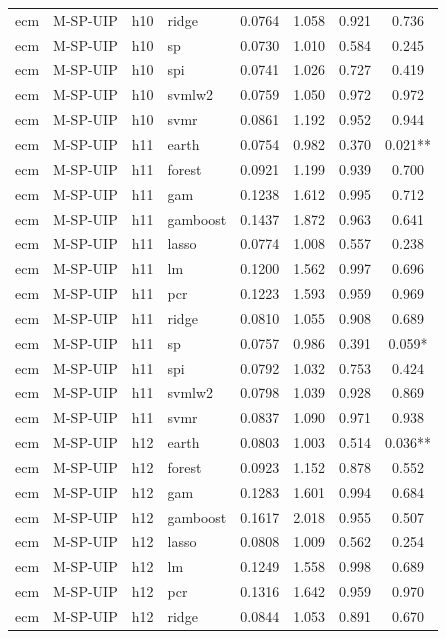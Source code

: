 \begin{ThreePartTable}
\begin{longtable}[t]{llclcccc}
ecm & M-SP-UIP & h10 & ridge & 0.0764 & 1.058 & 0.921 & 0.736\\
ecm & M-SP-UIP & h10 & sp & 0.0730 & 1.010 & 0.584 & 0.245\\
ecm & M-SP-UIP & h10 & spi & 0.0741 & 1.026 & 0.727 & 0.419\\
ecm & M-SP-UIP & h10 & svmlw2 & 0.0759 & 1.050 & 0.972 & 0.972\\
ecm & M-SP-UIP & h10 & svmr & 0.0861 & 1.192 & 0.952 & 0.944\\
\addlinespace
ecm & M-SP-UIP & h11 & earth & 0.0754 & 0.982 & 0.370 & 0.021**\\
ecm & M-SP-UIP & h11 & forest & 0.0921 & 1.199 & 0.939 & 0.700\\
ecm & M-SP-UIP & h11 & gam & 0.1238 & 1.612 & 0.995 & 0.712\\
ecm & M-SP-UIP & h11 & gamboost & 0.1437 & 1.872 & 0.963 & 0.641\\
ecm & M-SP-UIP & h11 & lasso & 0.0774 & 1.008 & 0.557 & 0.238\\
ecm & M-SP-UIP & h11 & lm & 0.1200 & 1.562 & 0.997 & 0.696\\
ecm & M-SP-UIP & h11 & pcr & 0.1223 & 1.593 & 0.959 & 0.969\\
ecm & M-SP-UIP & h11 & ridge & 0.0810 & 1.055 & 0.908 & 0.689\\
ecm & M-SP-UIP & h11 & sp & 0.0757 & 0.986 & 0.391 & 0.059*\\
ecm & M-SP-UIP & h11 & spi & 0.0792 & 1.032 & 0.753 & 0.424\\
ecm & M-SP-UIP & h11 & svmlw2 & 0.0798 & 1.039 & 0.928 & 0.869\\
ecm & M-SP-UIP & h11 & svmr & 0.0837 & 1.090 & 0.971 & 0.938\\
\addlinespace
ecm & M-SP-UIP & h12 & earth & 0.0803 & 1.003 & 0.514 & 0.036**\\
ecm & M-SP-UIP & h12 & forest & 0.0923 & 1.152 & 0.878 & 0.552\\
ecm & M-SP-UIP & h12 & gam & 0.1283 & 1.601 & 0.994 & 0.684\\
ecm & M-SP-UIP & h12 & gamboost & 0.1617 & 2.018 & 0.955 & 0.507\\
ecm & M-SP-UIP & h12 & lasso & 0.0808 & 1.009 & 0.562 & 0.254\\
ecm & M-SP-UIP & h12 & lm & 0.1249 & 1.558 & 0.998 & 0.689\\
ecm & M-SP-UIP & h12 & pcr & 0.1316 & 1.642 & 0.959 & 0.970\\
ecm & M-SP-UIP & h12 & ridge & 0.0844 & 1.053 & 0.891 & 0.670\\

\end{longtable}
\end{ThreePartTable}
